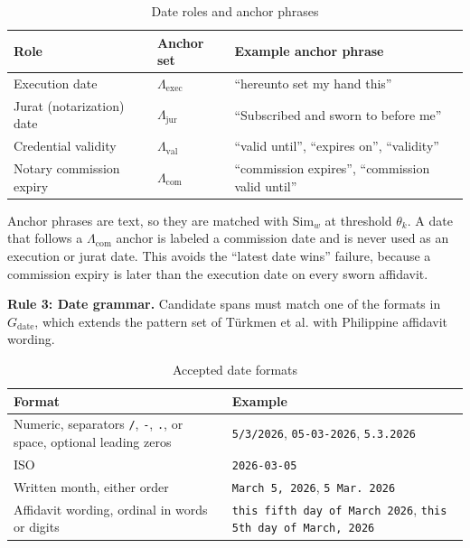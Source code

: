 \begin{table}[H]
\centering
\caption{Date roles and anchor phrases}
\label{tab:date_anchors}
\begin{tabular}{p{3.6cm}p{2cm}p{7.4cm}}
\toprule
\textbf{Role} & \textbf{Anchor set} & \textbf{Example anchor phrase} \\
\midrule
Execution date & $\Lambda_{\mathrm{exec}}$ & ``hereunto set my hand this'' \\
Jurat (notarization) date & $\Lambda_{\mathrm{jur}}$ & ``Subscribed and sworn to before me'' \\
Credential validity & $\Lambda_{\mathrm{val}}$ & ``valid until'', ``expires on'', ``validity'' \\
Notary commission expiry & $\Lambda_{\mathrm{com}}$ & ``commission expires'', ``commission valid until'' \\
\bottomrule
\end{tabular}
\end{table}

Anchor phrases are text, so they are matched with $\mathrm{Sim}_w$ at threshold $\theta_k$. A date that follows a $\Lambda_{\mathrm{com}}$ anchor is labeled a commission date and is never used as an execution or jurat date. This avoids the ``latest date wins'' failure, because a commission expiry is later than the execution date on every sworn affidavit.

\textbf{Rule 3: Date grammar.} Candidate spans must match one of the formats in $G_{\mathrm{date}}$, which extends the pattern set of Türkmen et al. with Philippine affidavit wording.

\begin{table}[H]
\centering
\caption{Accepted date formats}
\label{tab:date_formats}
\begin{tabular}{p{6.2cm}p{7cm}}
\toprule
\textbf{Format} & \textbf{Example} \\
\midrule
Numeric, separators \texttt{/}, \texttt{-}, \texttt{.}, or space, optional leading zeros & \texttt{5/3/2026}, \texttt{05-03-2026}, \texttt{5.3.2026} \\
ISO & \texttt{2026-03-05} \\
Written month, either order & \texttt{March 5, 2026}, \texttt{5 Mar.\ 2026} \\
Affidavit wording, ordinal in words or digits & \texttt{this fifth day of March 2026}, \texttt{this 5th day of March, 2026} \\
\bottomrule
\end{tabular}
\end{table}

